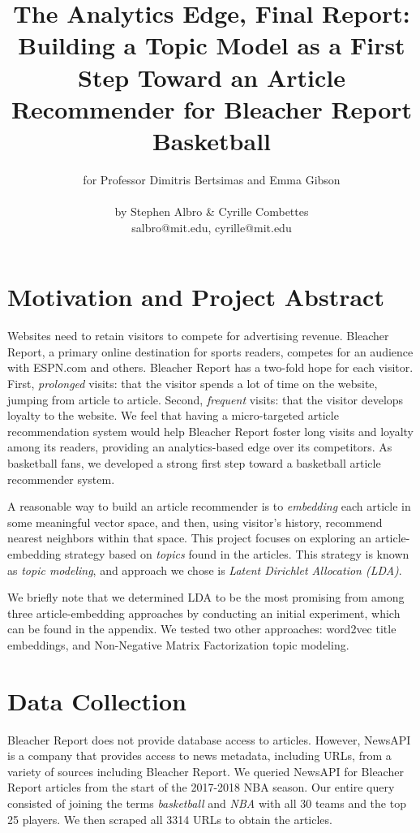 \documentclass[11pt]{article}
\title{The Analytics Edge, Final Report:\\ Building a Topic Model as a First Step Toward an Article Recommender for Bleacher Report Basketball}
\author{for Professor Dimitris Bertsimas and Emma Gibson \text{ } \\ \\ by Stephen Albro \& Cyrille Combettes \\ salbro@mit.edu, cyrille@mit.edu}
\begin{document}
\maketitle{}


\section{Motivation and Project Abstract}
Websites need to retain visitors to compete for advertising revenue. Bleacher Report, a primary online destination for sports readers, competes for an audience with ESPN.com and others. Bleacher Report has a two-fold hope for each visitor. First, \textit{prolonged} visits: that the visitor spends a lot of time on the website, jumping from article to article.  Second, \textit{frequent} visits: that the visitor develops loyalty to the website.  We feel that having a micro-targeted article recommendation system would help Bleacher Report foster long visits and loyalty among its readers, providing an analytics-based edge over its competitors.  As basketball fans, we developed a strong first step toward a basketball article recommender system.

A reasonable way to build an article recommender is to \textit{embedding} each article in some meaningful vector space, and then, using visitor's history, recommend nearest neighbors within that space. This project focuses on exploring an article-embedding strategy based on \textit{topics} found in the articles. This strategy is known as \textit{topic modeling}, and approach we chose is \textit{Latent Dirichlet Allocation (LDA)}.  

We briefly note that we determined LDA to be the most promising from among three article-embedding approaches by conducting an initial experiment, which  can be found in the appendix. We tested two other approaches: word2vec title embeddings, and Non-Negative Matrix Factorization topic modeling. 

\section{Data Collection}
Bleacher Report does not provide database access to articles.  However, NewsAPI is a company that provides access to news metadata, including URLs, from a variety of sources including Bleacher Report.  We queried NewsAPI for Bleacher Report articles from the start of the 2017-2018 NBA season. Our entire query consisted of joining the terms \textit{basketball} and \textit{NBA} with all 30 teams and the top 25 players.  We then scraped all 3314 URLs to obtain the articles.
\end{document}
